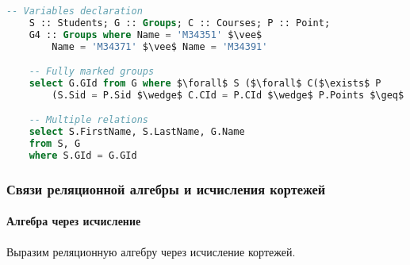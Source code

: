 \begin{lstlisting}[language=SQL, mathescape=true]
    -- Variables declaration
    S :: Students; G :: Groups; C :: Courses; P :: Point;
    G4 :: Groups where Name = 'M34351' $\vee$
        Name = 'M34371' $\vee$ Name = 'M34391'

    -- Fully marked groups
    select G.GId from G where $\forall$ S ($\forall$ C($\exists$ P
        (S.Sid = P.Sid $\wedge$ C.CId = P.CId $\wedge$ P.Points $\geq$ 60)))

    -- Multiple relations
    select S.FirstName, S.LastName, G.Name
    from S, G
    where S.GId = G.GId
\end{lstlisting}

\subsubsection{Связи реляционной алгебры и исчисления кортежей}

\paragraph{Алгебра через исчисление}

Выразим реляционную алгебру через исчисление кортежей.

